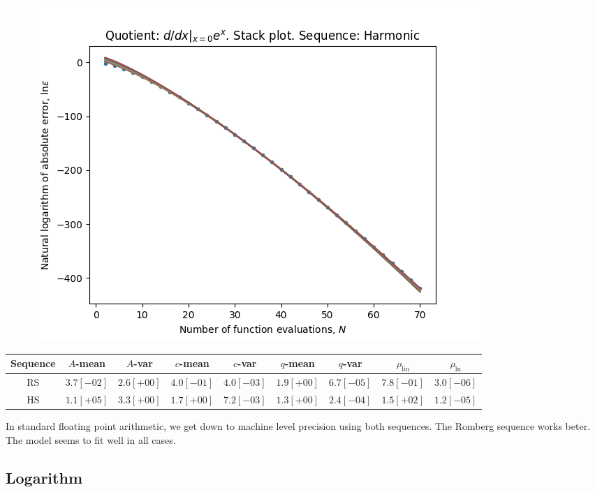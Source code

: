 \begin{figure}[H]
\centering
\begin{minipage}{0.45\textwidth}
\centering
\includegraphics[scale=0.45]{../results/diff_quot_plots/exp_0_hp_harmonic_stack.png}
\end{minipage}
\end{figure}

\begin{table}[H]
    \centering
    \small
    \begin{tabular}{c||c|c|c|c|c|c|c|c}
Sequence & \(A\)-mean & \(A\)-var & \(c\)-mean & \(c\)-var & \(q\)-mean & \(q\)-var & \(\rho_{\operatorname{lin}}\) & \(\rho_{\ln}\)\\\hline
\rowcolor{green}
RS & \(3.7[-02]\) & \(2.6[+00]\) & \(4.0[-01]\) & \(4.0[-03]\) & \(1.9[+00]\) & \(6.7[-05]\) & \(7.8[-01]\) & \(3.0[-06]\) \\
\rowcolor{green}
HS & \(1.1[+05]\) & \(3.3[+00]\) & \(1.7[+00]\) & \(7.2[-03]\) & \(1.3[+00]\) & \(2.4[-04]\) & \(1.5[+02]\) & \(1.2[-05]\) \\
    \end{tabular}
    \label{tab:my_label}
\end{table}

In standard floating point arithmetic, we get down to machine level precision using both sequences. The Romberg sequence works beter. The model seems to fit well in all cases.

\subsection{Logarithm}

